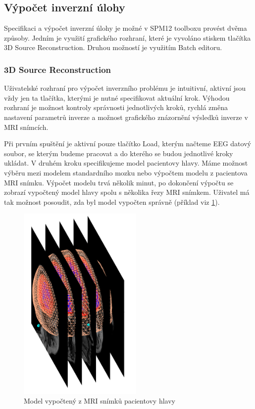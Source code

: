 \subsection{Výpočet inverzní úlohy}
Specifikaci a výpočet inverzní úlohy je možné v SPM12 toolboxu provést dvěma způsoby. Jedním je využití grafického rozhraní, které je vyvoláno stiskem tlačítka 3D Source Reconstruction. Druhou možností je využitím Batch editoru.

\subsubsection{3D Source Reconstruction}
Uživatelské rozhraní pro výpočet inverzního problému je intuitivní, aktivní jsou vždy jen ta tlačítka, kterými je nutné specifikovat aktuální krok. Výhodou rozhraní je možnost kontroly správnosti jednotlivých kroků, rychlá změna nastavení parametrů inverze a možnost grafického znázornění výsledků inverze v MRI snímcích.

Při prvním spuštění je aktivní pouze tlačítko Load, kterým načteme EEG datový soubor, se kterým budeme pracovat a do kterého se budou jednotlivé kroky ukládat. V druhém kroku specifikujeme model pacientovy hlavy. Máme možnost výběru mezi modelem standardního mozku nebo výpočtem modelu z pacientova MRI snímku. Výpočet modelu trvá několik minut, po dokončení výpočtu se zobrazí vypočtený model hlavy spolu s několika řezy MRI snímkem. Uživatel má tak možnost posoudit, zda byl model vypočten správně (příklad viz \ref{prikladMRImodelu}).

\begin{figure}[!h]
\includegraphics[width = 6cm]{casti/implementace/sourceReconstruction/MRI.png}
\caption{Model vypočtený z MRI snímků pacientovy hlavy}
\label{prikladMRImodelu}
\end{figure}

